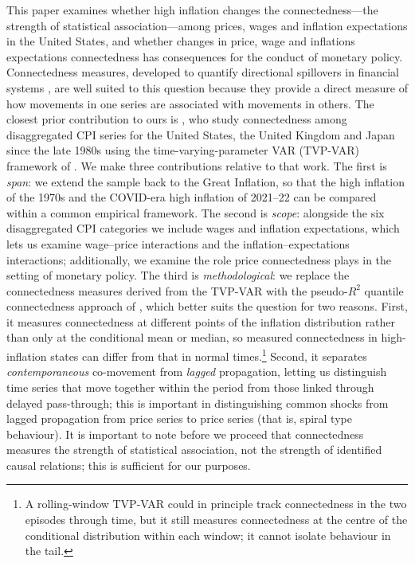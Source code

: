 \documentclass{article}
\begin{document}
This paper examines whether high inflation changes the connectedness---the strength
of statistical association---among prices, wages and inflation expectations in the
United States, and whether changes in price, wage and inflations expectations connectedness has consequences for the conduct of
monetary policy. Connectedness measures, developed to quantify directional spillovers
in financial systems \autocite{dieboldyilmaz2012}, are well suited to this question
because they provide a direct measure of how movements in one series are associated
with movements in others. The closest prior contribution to ours is
\textcite{stenfors2026decomposing}, who study connectedness among disaggregated CPI
series for the United States, the United Kingdom and Japan since the late 1980s using
the time-varying-parameter VAR (TVP-VAR) framework of \textcite{antonakakis2020}. We
make three contributions relative to that work. The first is \emph{span}: we extend
the sample back to the Great Inflation, so that the high inflation of the 1970s and the
COVID-era  high inflation of 2021--22 can be compared within a common empirical framework. The
second is \emph{scope}: alongside the six disaggregated CPI categories we include
wages and inflation expectations, which lets us examine wage--price interactions and the
inflation--expectations interactions; additionally, we examine the role price connectedness plays in the setting of monetary policy. The third is \emph{methodological}: we replace the connectedness measures derived from the TVP-VAR with the
pseudo-$R^2$ quantile connectedness approach of \textcite{shahzadetal}, which better suits the
question for two reasons. First, it measures connectedness at different points of the
inflation distribution rather than only at the conditional mean or median, so measured connectedness in high-inflation states can differ from that in normal
times.\footnote{A rolling-window TVP-VAR could in principle track connectedness in the two episodes
through time, but it still measures connectedness at the centre of the conditional
distribution within each window; it cannot isolate behaviour in the tail.} Second, it
separates \emph{contemporaneous} co-movement from \emph{lagged} propagation, letting us
distinguish time series that move together within the period from those linked through
delayed pass-through; this is important in distinguishing common shocks from lagged propagation from price series to price series (that is, spiral type behaviour).  It is important to note before we proceed that connectedness measures the strength of statistical
association, not the strength of identified causal relations; this is sufficient for our purposes.
\end{document}
